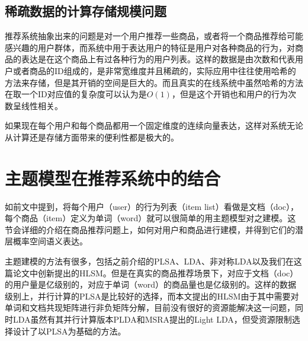 \subsection{稀疏数据的计算存储规模问题}
推荐系统抽象出来的问题是对一个用户推荐一些商品，或者将一个商品推荐给可能感兴趣的用户群体，而系统中用于表达用户的特征是用户对各种商品的行为，对商品的表达是在这个商品上有过各种行为的用户列表。这样的数据是由次数和代表用户或者商品的ID组成的，是非常宽维度并且稀疏的，实际应用中往往使用哈希的方法来存储，但是其开销的空间是巨大的。而且真实的在线系统中虽然哈希的方法在取一个ID对应值的复杂度可以认为是$O(1)$，但是这个开销也和用户的行为次数呈线性相关。

如果现在每个用户和每个商品都用一个固定维度的连续向量表达，这样对系统无论从计算还是存储方面带来的便利性都是极大的。
\section{主题模型在推荐系统中的结合}
如前文中提到，将每个用户（user）的行为列表（item list）看做是文档（doc），每个商品（item）定义为单词（word）就可以很简单的用主题模型对之建模。这节会详细的介绍在商品推荐问题上，如何对用户和商品进行建模，并得到它们的潜层概率空间语义表达。

主题建模的方法有很多，包括之前介绍的PLSA、LDA、非对称LDA以及我们在这篇论文中创新提出的HLSM。但是在真实的商品推荐场景下，对应于文档（doc）的用户量是亿级别的，对应于单词（word）的商品量也是亿级别的。这样的数据级别上，并行计算的PLSA是比较好的选择，而本文提出的HLSM由于其中需要对单词和文档共现矩阵进行非负矩阵分解，目前没有很好的资源能解决这一问题，同时LDA虽然有其并行计算版本PLDA\cite{PLDA}和MSRA提出的Light LDA\cite{lightLDA}，但受资源限制选择设计了以PLSA为基础的方法。

